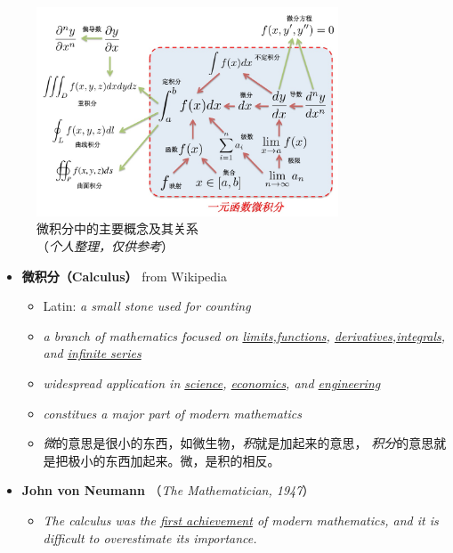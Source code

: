 %	


\begin{figure}[htbp]
	\centering
	\includegraphics[width=0.8\textwidth]{./images/ch00/AM_architecture.jpg}
	\caption{微积分中的主要概念及其关系\\ （{\it 个人整理，仅供参考}）}
\end{figure}

\begin{itemize}
	  \item {\bf 微积分（Calculus）} \hfill from Wikipedia
	\begin{itemize}
	  \item Latin: {\it a small stone used for counting}  
	  \item {\it a branch of mathematics focused on
	  \underline{limits},\underline{functions},
	  \underline{derivatives},\underline{integrals}, and \underline{infinite series} }
  	  \item {\it widespread application in \underline{science},
  	  \underline{economics}, and \underline{engineering}} 
	  \item {\it constitues a major part of modern mathematics}
	  \item {\it 微}的意思是很小的东西，如微生物，{\it 积}就是加起来的意思，
	  {\it 积分}的意思就是把极小的东西加起来。微，是积的相反。 
	\end{itemize}
	\item {\bf John von Neumann} （{\small\it The Mathematician, 1947}）
	\begin{itemize}
	  \item {\it The calculus was the \underline{first achievement} of modern
	  mathematics, and it is difficult to overestimate its importance.}
	\end{itemize} 
\end{itemize}

